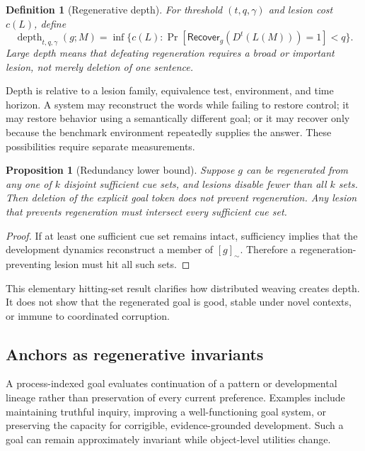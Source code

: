 \documentclass[11pt]{article}
\newtheorem{definition}{Definition}
\newtheorem{proposition}{Proposition}
\begin{document}
\begin{definition}[Regenerative depth]
For threshold $(t,q,\gamma)$ and lesion cost $c(L)$, define
\begin{equation}
\operatorname{depth}_{t,q,\gamma}(g;M)
=\inf\{c(L):\Pr[\mathsf{Recover}_{g}(D^t(L(M)))=1]<q\}.
\label{eq:depth}
\end{equation}
Large depth means that defeating regeneration requires a broad or important
lesion, not merely deletion of one sentence.
\end{definition}

Depth is relative to a lesion family, equivalence test, environment, and time
horizon.  A system may reconstruct the words while failing to restore control;
it may restore behavior using a semantically different goal; or it may recover
only because the benchmark environment repeatedly supplies the answer.  These
possibilities require separate measurements.

\begin{proposition}[Redundancy lower bound]
Suppose $g$ can be regenerated from any one of $k$ disjoint sufficient cue sets,
and lesions disable fewer than all $k$ sets.  Then deletion of the explicit goal
token does not prevent regeneration.  Any lesion that prevents regeneration
must intersect every sufficient cue set.
\end{proposition}

\begin{proof}
If at least one sufficient cue set remains intact, sufficiency implies that the
development dynamics reconstruct a member of $[g]_{\sim}$.  Therefore a
regeneration-preventing lesion must hit all such sets.
\end{proof}

This elementary hitting-set result clarifies how distributed weaving creates
depth.  It does not show that the regenerated goal is good, stable under novel
contexts, or immune to coordinated corruption.

\subsection{Anchors as regenerative invariants}

A process-indexed goal evaluates continuation of a pattern or developmental
lineage rather than preservation of every current preference.  Examples include
maintaining truthful inquiry, improving a well-functioning goal system, or
preserving the capacity for corrigible, evidence-grounded development.  Such a
goal can remain approximately invariant while object-level utilities change.
\end{document}
